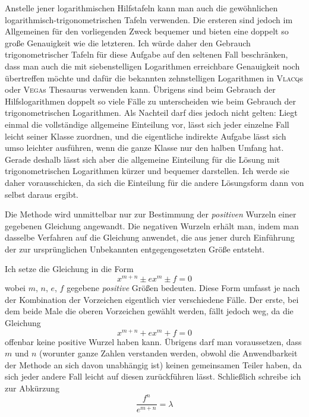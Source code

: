 Anstelle jener logarithmischen Hilfstafeln kann man auch die gewöhnlichen logarithmisch-trigonometrischen Tafeln verwenden. Die ersteren sind jedoch im Allgemeinen für den vorliegenden Zweck bequemer und bieten eine doppelt so große Genauigkeit wie die letzteren. Ich würde daher den Gebrauch trigonometrischer Tafeln für diese Aufgabe auf den seltenen Fall beschränken, dass man auch die mit siebenstelligen Logarithmen erreichbare Genauigkeit noch übertreffen möchte und dafür die bekannten zehnstelligen Logarithmen in \textsc{Vlacq}s oder \textsc{Vega}s Thesaurus verwenden kann. Übrigens sind beim Gebrauch der Hilfslogarithmen doppelt so viele Fälle zu unterscheiden wie beim Gebrauch der trigonometrischen Logarithmen. Als Nachteil darf dies jedoch nicht gelten: Liegt einmal die vollständige allgemeine Einteilung vor, lässt sich jeder einzelne Fall leicht seiner Klasse zuordnen, und die eigentliche indirekte Aufgabe lässt sich umso leichter ausführen, wenn die ganze Klasse nur den halben Umfang hat. Gerade deshalb lässt sich aber die allgemeine Einteilung für die Lösung mit trigonometrischen Logarithmen kürzer und bequemer darstellen. Ich werde sie daher vorausschicken, da sich die Einteilung für die andere Lösungsform dann von selbst daraus ergibt.

Die Methode wird unmittelbar nur zur Bestimmung der \textit{positiven} Wurzeln einer gegebenen Gleichung angewandt. Die negativen Wurzeln erhält man, indem man dasselbe Verfahren auf die Gleichung anwendet, die aus jener durch Einführung der zur ursprünglichen Unbekannten entgegengesetzten Größe entsteht.

Ich setze die Gleichung in die Form
\[
x^{m+n}\pm e x^m\pm f=0
\]
wobei $m$, $n$, $e$, $f$ gegebene \textit{positive} Größen bedeuten. Diese Form umfasst je nach der Kombination der Vorzeichen eigentlich vier verschiedene Fälle. Der erste, bei dem beide Male die oberen Vorzeichen gewählt werden, fällt jedoch weg, da die Gleichung
\[
x^{m+n}+e x^m+f=0
\]
offenbar keine positive Wurzel haben kann. Übrigens darf man voraussetzen, dass $m$ und $n$ (worunter ganze Zahlen verstanden werden, obwohl die Anwendbarkeit der Methode an sich davon unabhängig ist) keinen gemeinsamen Teiler haben, da sich jeder andere Fall leicht auf diesen zurückführen lässt. Schließlich schreibe ich zur Abkürzung
\[
\frac{f^n}{e^{m+n}}=\lambda
\]

